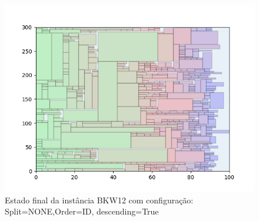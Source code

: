\begin{figure}[H]
    \centering
    \caption[]{Estado final da instância BKW12 com configuração: Split=NONE,Order=ID, descending=True}
    \label{fig:bkw12-none-id-true}
    \includegraphics[scale=0.5]{output/figures/bkw/bkw12/none/id/true/000}
\end{figure}